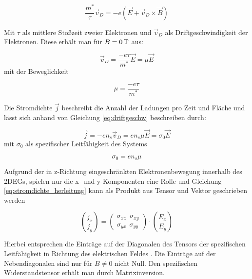 \begin{equation}
\frac{m^*}{\tau} \vec{v}_D = -e(\vec{E}+\vec{v}_D \times \vec{B})
\label{eq:beweggl_stat}
\end{equation}

Mit $\tau$ als mittlere Stoßzeit zweier Elektronen und $\vec{v}_D$ als Driftgeschwindigkeit der Elektronen. Diese erhält man für $B=\unit[0]{T}$ aus:

\begin{equation}
\vec{v}_D=\frac{-e\tau}{m^*}\vec{E}=\mu\vec{E}
\label{eq:driftgeschw}
\end{equation}
mit der Beweglichkeit

\begin{equation}
\mu=\frac{-e\tau}{m^*}
\label{eq:bewegl_def}
\end{equation}

Die Stromdichte $\vec{j}$ beschreibt die Anzahl der Ladungen pro Zeit und Fläche und lässt sich anhand von Gleichung \ref{eq:driftgeschw} beschreiben durch:

\begin{equation}
\vec{j}=-en_s\vec{v}_D=en_s\mu\vec{E}=\sigma_0\vec{E}
\label{eq:stromdichte_herleitung}
\end{equation}
mit $\sigma_0$ als spezifischer Leitfähigkeit des Systems

\begin{equation}
\sigma_0=en_s\mu
\label{eq:sigma_def}
\end{equation}

Aufgrund der in z-Richtung eingeschränkten Elektronenbewegung innerhalb des 2DEGs, spielen nur die x- und y-Komponenten eine Rolle und Gleichung \ref{eq:stromdichte_herleitung} kann als Produkt aus Tensor und Vektor geschrieben werden

\begin{equation}
{j_x\choose j_y}=\begin{pmatrix}
\sigma_{xx} ~~ \sigma_{xy} \\ \sigma_{yx} ~~ \sigma_{yy}
\end{pmatrix} \cdot {E_x \choose E_y}
\label{eq:stromdichte_matrixdarst}
\end{equation}

Hierbei entsprechen die Einträge auf der Diagonalen des Tensors der spezifischen Leitfähigkeit in Richtung des elektrischen Feldes \cite[Kap.3.6]{kopitzki_einfuhrung_2009}. Die Einträge auf der Nebendiagonalen sind nur für $B\neq0$ nicht Null.
Den spezifischen Widerstandstensor erhält man durch Matrixinversion.


